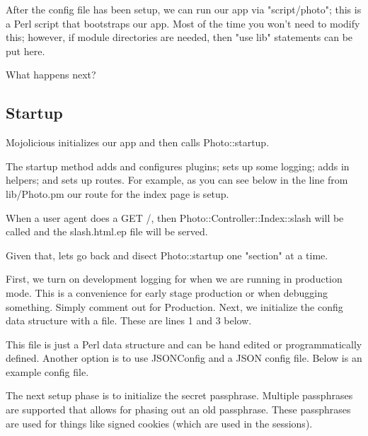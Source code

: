 \documentclass[14pt]{extreport}
\newcommand\Small{\fontsize{12}{13.0}\fontencoding{T1}\selectfont}
\newcommand*\LSTfont{\Small\ttfamily\SetTracking{encoding=*}{-60}\lsstyle}
\begin{document}
After the config file has been setup, we can run our app via "script/photo";
this is a Perl script that bootstraps our app.  Most of the time you won't need
to modify this; however, if module directories are needed, then "use lib" statements
can be put here.

What happens next?

\subsection{Startup}

Mojolicious initializes our app and then calls Photo::startup.

The startup method adds and configures plugins; sets up some logging; adds in
helpers; and sets up routes.  For example, as you can see below in the line
from lib/Photo.pm our route for the index page is setup.



When a user agent does a GET /, then Photo::Controller::Index::slash will be
called and the slash.html.ep file will be served.

Given that, lets go back and disect Photo::startup one "section" at a time.

First, we turn on development logging for when we are running in production
mode.  This is a convenience for early stage production or when debugging
something.  Simply comment out for Production.  Next, we initialize the
config data structure with a file.  These are lines 1 and 3 below.



This file is just a Perl data structure and can be hand edited or
programmatically defined.  Another option is to use JSONConfig and a JSON
config file.  Below is an example config file.



The next setup phase is to initialize the secret passphrase.  Multiple
passphrases are supported that allows for phasing out an old passphrase.  These
passphrases are used for things like signed cookies (which are used in the
sessions).


\end{document}
